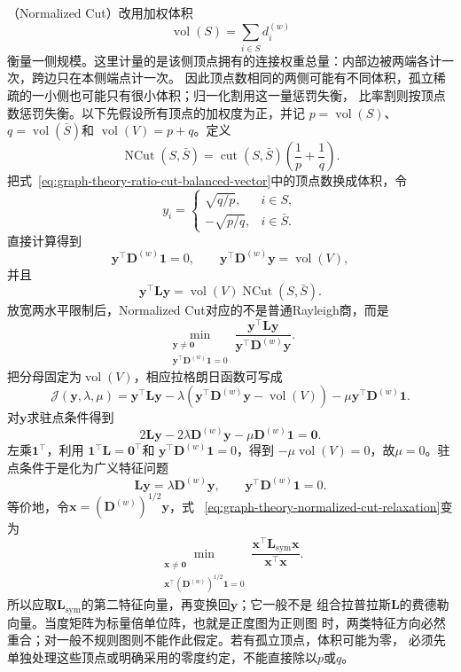 （Normalized Cut）改用加权体积
\[
  \operatorname{vol}(S)=\sum_{i\in S}d_i^{(w)}
\]
衡量一侧规模。这里计量的是该侧顶点拥有的连接权重总量：内部边被两端各计一次，跨边只在本侧端点计一次。
因此顶点数相同的两侧可能有不同体积，孤立稀疏的一小侧也可能只有很小体积；归一化割用这一量惩罚失衡，
比率割则按顶点数惩罚失衡。以下先假设所有顶点的加权度为正，并记
\(p=\operatorname{vol}(S)\)、\(q=\operatorname{vol}(\bar S)\)和
\(\operatorname{vol}(V)=p+q\)。定义
\begin{equation}
  \operatorname{NCut}(S,\bar S)
  =
  \operatorname{cut}(S,\bar S)
  \left(\frac1p+\frac1q\right).
  \label{eq:graph-theory-normalized-cut}
\end{equation}
把式~\eqref{eq:graph-theory-ratio-cut-balanced-vector}中的顶点数换成体积，令
\[
  y_i=
  \begin{cases}
    \sqrt{q/p},&i\in S,\\
    -\sqrt{p/q},&i\in\bar S.
  \end{cases}
\]
直接计算得到
\[
  \bm{y}^{\top}\bm{D}^{(w)}\bm{1}=0,\qquad
  \bm{y}^{\top}\bm{D}^{(w)}\bm{y}=\operatorname{vol}(V),
\]
并且
\[
  \bm{y}^{\top}\bm{L}\bm{y}
  =
  \operatorname{vol}(V)\operatorname{NCut}(S,\bar S).
\]
放宽两水平限制后，Normalized Cut对应的不是普通Rayleigh商，而是
\begin{equation}
  \min_{\substack{\bm{y}\neq\bm{0}\\
          \bm{y}^{\top}\bm{D}^{(w)}\bm{1}=0}}
  \frac{\bm{y}^{\top}\bm{L}\bm{y}}
       {\bm{y}^{\top}\bm{D}^{(w)}\bm{y}}.
  \label{eq:graph-theory-normalized-cut-relaxation}
\end{equation}
把分母固定为\(\operatorname{vol}(V)\)，相应拉格朗日函数可写成
\[
  \mathcal{J}(\bm{y},\lambda,\mu)
  =
  \bm{y}^{\top}\bm{L}\bm{y}
  -\lambda\left(
    \bm{y}^{\top}\bm{D}^{(w)}\bm{y}-\operatorname{vol}(V)
  \right)
  -\mu\bm{y}^{\top}\bm{D}^{(w)}\bm{1}.
\]
对\(\bm{y}\)求驻点条件得到
\[
  2\bm{L}\bm{y}
  -2\lambda\bm{D}^{(w)}\bm{y}
  -\mu\bm{D}^{(w)}\bm{1}
  =\bm{0}.
\]
左乘\(\bm{1}^{\top}\)，利用
\(\bm{1}^{\top}\bm{L}=\bm{0}^{\top}\)和
\(\bm{y}^{\top}\bm{D}^{(w)}\bm{1}=0\)，得到
\(-\mu\operatorname{vol}(V)=0\)，故\(\mu=0\)。驻点条件于是化为广义特征问题
\begin{equation}
  \bm{L}\bm{y}=\lambda\bm{D}^{(w)}\bm{y},
  \qquad
  \bm{y}^{\top}\bm{D}^{(w)}\bm{1}=0.
  \label{eq:graph-theory-normalized-cut-generalized-eigenproblem}
\end{equation}
等价地，令\(\bm{x}=(\bm{D}^{(w)})^{1/2}\bm{y}\)，式
~\eqref{eq:graph-theory-normalized-cut-relaxation}变为
\[
  \min_{\substack{\bm{x}\neq\bm{0}\\
        \bm{x}^{\top}(\bm{D}^{(w)})^{1/2}\bm{1}=0}}
  \frac{\bm{x}^{\top}\bm{L}_{\mathrm{sym}}\bm{x}}
       {\bm{x}^{\top}\bm{x}}.
\]
所以应取\(\bm{L}_{\mathrm{sym}}\)的第二特征向量，再变换回\(\bm{y}\)；它一般不是
组合拉普拉斯\(\bm{L}\)的费德勒向量。当度矩阵为标量倍单位阵，也就是正度图为正则图
时，两类特征方向必然重合；对一般不规则图则不能作此假定。若有孤立顶点，体积可能为零，
必须先单独处理这些顶点或明确采用的零度约定，不能直接除以\(p\)或\(q\)。

